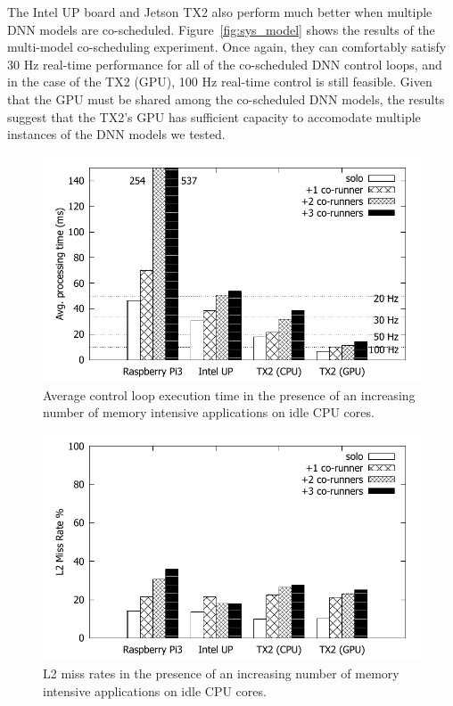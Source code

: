 The Intel UP board and Jetson TX2 also perform much better when multiple DNN models
are co-scheduled. Figure~\ref{fig:sys_model} shows the results of the
multi-model co-scheduling experiment. Once again, they can comfortably
satisfy 30 Hz real-time performance for all of the co-scheduled DNN control
loops, and in the case of the TX2 (GPU), 100 Hz real-time control is still
feasible. Given that the GPU must be shared among the co-scheduled DNN
models, the results suggest that the TX2's GPU has sufficient capacity to
accomodate multiple instances of the DNN models we tested.

\begin{figure}[h]
  \centering
  \includegraphics[width=.45\textwidth]{figs/compare_benchmark}
  \caption{Average control loop execution time in the presence of an
    increasing number of memory intensive applications on idle CPU cores.}
  \label{fig:sys_bench}
\end{figure} 

\begin{figure}[h]
  \centering
  \includegraphics[width=.45\textwidth]{figs/compare_l2missrate}
  \caption{L2 miss rates in the presence of an increasing number of 
			memory intensive applications on idle CPU cores.}
  \label{fig:sys_l2miss}
\end{figure}


